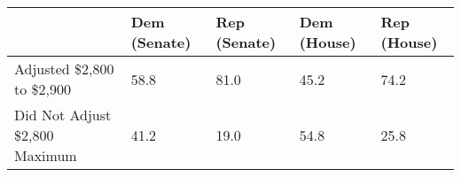 \begin{tabular}{lllll}
  \toprule
  & Dem (Senate) & Rep (Senate) & Dem (House) & Rep (House) \\ 
  \midrule
Adjusted \$2,800 to \$2,900 & 58.8 & 81.0 & 45.2 & 74.2 \\ 
  Did Not Adjust \$2,800 Maximum & 41.2 & 19.0 & 54.8 & 25.8 \\ 
   \bottomrule
\end{tabular}
